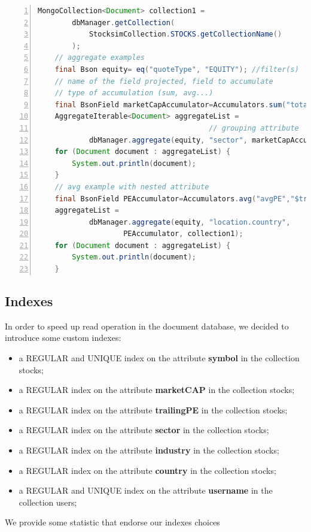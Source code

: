 \begin{lstlisting}[basicstyle=\footnotesize,language=Java,numbers=left,
    numberstyle=\footnotesize,numbersep=4pt,frame=single]
    MongoCollection<Document> collection1 = 
        dbManager.getCollection(
            StocksimCollection.STOCKS.getCollectionName()
        );
    // aggregate examples
    final Bson equity= eq("quoteType", "EQUITY"); //filter(s)
    // name of the field projected, field to accumulate
    // type of accumulation (sum, avg...)
    final BsonField marketCapAccumulator=Accumulators.sum("totalCap","$marketCap");
    AggregateIterable<Document> aggregateList =
                                        // grouping attribute
            dbManager.aggregate(equity, "sector", marketCapAccumulator, collection1);
    for (Document document : aggregateList) {
        System.out.println(document);
    }
    // avg example with nested attribute
    final BsonField PEAccumulator=Accumulators.avg("avgPE","$trailingPE");
    aggregateList =
            dbManager.aggregate(equity, "location.country",
                    PEAccumulator, collection1);
    for (Document document : aggregateList) {
        System.out.println(document);
    }
\end{lstlisting}
\subsection{Indexes}
In order to speed up read operation in the document database, 
we decided to introduce some custom indexes:
\begin{itemize}
    \item a REGULAR and UNIQUE index on the attribute \textbf{symbol} in the collection stocks;
    \item a REGULAR index on the attribute \textbf{marketCAP} in the collection stocks;
    \item a REGULAR index on the attribute \textbf{trailingPE} in the collection stocks;
    \item a REGULAR index on the attribute \textbf{sector} in the collection stocks;
    \item a REGULAR index on the attribute \textbf{industry} in the collection stocks;
    \item a REGULAR index on the attribute \textbf{country} in the collection stocks;
    \item a REGULAR and UNIQUE index on the attribute \textbf{username} in the collection users;
\end{itemize}
We provide some statistic that endorse our indexes choices\\

